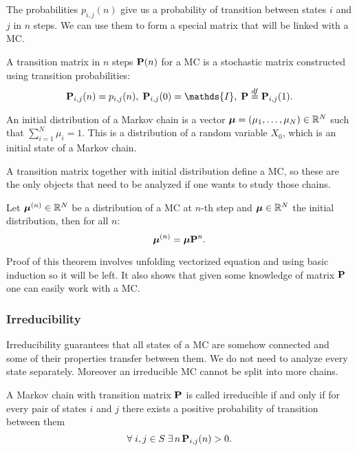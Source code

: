 	The probabilities $p_{i,j}(n)$ give us a probability of transition between states $i$ and $j$ in $n$  steps. We can use them to form a special matrix that will be linked with a MC.
	\begin{definition}
		A transition matrix in $n$ steps $\mathbf{P}(n)$ for a MC is a stochastic matrix constructed using transition probabilities:
		\begin{equation*}
			\PP_{i,j}(n) = p_{i,j}(n), \; \PP_{i,j}(0) = \mathds{I}, \; \PP \overset{df}{=} \PP_{i,j}(1).
		\end{equation*}
	\end{definition}
	
	\begin{definition}
		An initial distribution of a Markov chain is a vector $\bm{\mu} = (\mu_1, \ldots, \mu_N) \in \mathbb{R}^N$ such that $\sum_{i=1}^{N} \mu_i = 1$. This is a distribution of a random variable $X_0$, which is an initial state of a Markov chain.
	\end{definition}

	A transition matrix together with initial distribution define a MC, so these are the only objects that need to be analyzed if one wants to study those chains.
	
	\begin{theorem}
		Let $\bm{\mu}^{(n)} \in \mathbb{R}^N$ be a distribution of a MC at $n$-th step and $\bm{\mu} \in \mathbb{R}^N$ the initial distribution, then for all $n$:
		\begin{equation*}
			\bm{\mu}^{(n)} = \bm{\mu} \mathbf{P}^n.
		\end{equation*}
	\end{theorem}
	Proof of this theorem involves unfolding vectorized equation and using basic induction so it will be left. It also shows that given some knowledge of matrix $\mathbf{P}$ one can easily work with a MC.
	
	\subsubsection{Irreducibility}
		Irreducibility guarantees that all states of a MC are somehow connected and some of their properties transfer between them. We do not need to analyze every state separately. Moreover an irreducible MC cannot be split into more chains.
		\begin{definition}[Irreducibility]
			A Markov chain with transition matrix $\mathbf{P}$ is called irreducible if and only if for every pair of states $i$ and $j$ there exists a positive probability of transition between them \ie
			\begin{equation*}
				\forall \; i,j \in S \; \exists \, n \, \mathbf{P}_{i,j}(n) > 0.
			\end{equation*}
		\end{definition}
	
